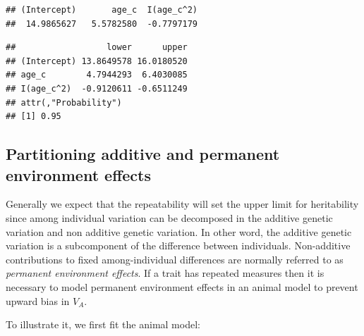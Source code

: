 \documentclass[
  12pt,
]{book}
\newenvironment{Shaded}{\begin{snugshade}}{\end{snugshade}}
\newcommand{\DataTypeTok}[1]{\textcolor[rgb]{0.13,0.29,0.53}{#1}}
\newcommand{\DecValTok}[1]{\textcolor[rgb]{0.00,0.00,0.81}{#1}}
\newcommand{\FloatTok}[1]{\textcolor[rgb]{0.00,0.00,0.81}{#1}}
\newcommand{\KeywordTok}[1]{\textcolor[rgb]{0.13,0.29,0.53}{\textbf{#1}}}
\newcommand{\NormalTok}[1]{#1}
\newcommand{\OperatorTok}[1]{\textcolor[rgb]{0.81,0.36,0.00}{\textbf{#1}}}
\newcommand{\OtherTok}[1]{\textcolor[rgb]{0.56,0.35,0.01}{#1}}
\newcommand{\StringTok}[1]{\textcolor[rgb]{0.31,0.60,0.02}{#1}}
\begin{document}
\begin{verbatim}
## (Intercept)       age_c  I(age_c^2) 
##  14.9865627   5.5782580  -0.7797179
\end{verbatim}

\begin{Shaded}
\end{Shaded}

\begin{verbatim}
##                  lower      upper
## (Intercept) 13.8649578 16.0180520
## age_c        4.7944293  6.4030085
## I(age_c^2)  -0.9120611 -0.6511249
## attr(,"Probability")
## [1] 0.95
\end{verbatim}

\hypertarget{partitioning-additive-and-permanent-environment-effects-1}{%
\subsection{Partitioning additive and permanent environment effects}\label{partitioning-additive-and-permanent-environment-effects-1}}

Generally we expect that the repeatability will set the upper limit for heritability since among individual variation can be decomposed in the additive genetic variation and non additive genetic variation. In other word, the additive genetic variation is a subcomponent of the difference between individuals.
Non-additive contributions to fixed among-individual differences are normally referred to as \emph{permanent environment effects}. If a trait has repeated measures then it is necessary to model permanent environment effects in an animal model to prevent upward bias in \(V_A\).

To illustrate it, we first fit the animal model:

\begin{Shaded}
\end{Shaded}
\end{document}
